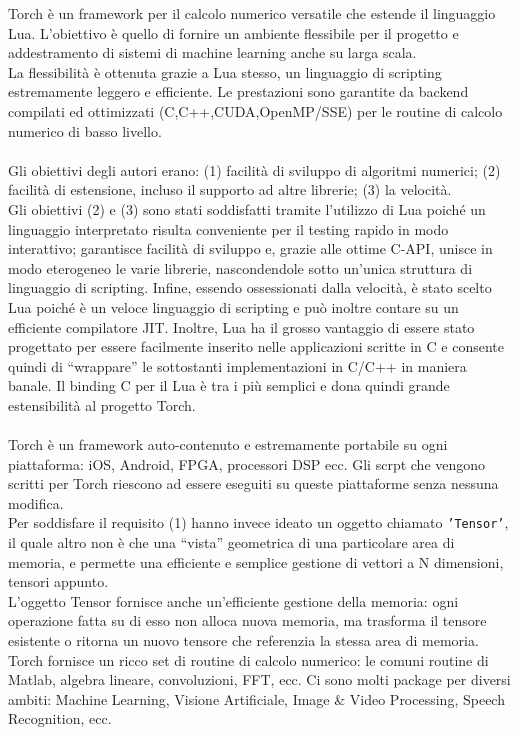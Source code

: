 Torch\parencite{WTorch} è un framework per il calcolo numerico versatile che estende il linguaggio Lua. L'obiettivo è quello di fornire un ambiente flessibile per il progetto e addestramento di sistemi di machine learning anche su larga scala.\\
La flessibilità è ottenuta grazie a Lua stesso, un linguaggio di scripting estremamente leggero e efficiente. Le prestazioni sono garantite da backend compilati ed ottimizzati (C,C++,CUDA,OpenMP/SSE) per le routine di calcolo numerico di basso livello.
\\
\\
Gli obiettivi degli autori erano: (1) facilità di sviluppo di algoritmi numerici; (2) facilità di
estensione, incluso il supporto ad altre librerie; (3) la velocità.\\
Gli obiettivi (2) e (3) sono stati soddisfatti tramite l'utilizzo di Lua poiché un linguaggio interpretato risulta conveniente per il testing rapido in modo interattivo; garantisce facilità di sviluppo e, grazie alle ottime C-API, unisce in modo eterogeneo le varie librerie,
nascondendole sotto un'unica struttura di linguaggio di scripting.  Infine, essendo ossessionati dalla velocità, è stato scelto Lua poiché è un veloce linguaggio di scripting e può inoltre contare su un efficiente compilatore JIT.
Inoltre, Lua ha il grosso vantaggio di essere stato progettato per essere facilmente inserito nelle applicazioni scritte in C e consente quindi di “wrappare” le sottostanti implementazioni in C/C++ in maniera banale. Il binding C per il Lua è tra i più semplici e dona quindi grande estensibilità al progetto Torch. 
\\
\\
Torch è un framework auto-contenuto e estremamente portabile su ogni piattaforma: iOS, Android, FPGA, processori DSP ecc. Gli scrpt che vengono scritti per Torch riescono ad essere eseguiti su queste piattaforme senza nessuna modifica.
\\
Per soddisfare il requisito (1) hanno invece ideato un oggetto chiamato \texttt{'Tensor'}, il quale altro non è che una “vista” geometrica di una particolare area di memoria, e permette una efficiente e semplice 
gestione di vettori a N dimensioni, tensori appunto.\\
L’oggetto Tensor fornisce anche un’efficiente gestione della memoria: ogni operazione fatta su di esso non alloca nuova memoria, ma trasforma il tensore esistente o ritorna un nuovo tensore che referenzia la stessa area di memoria.
Torch fornisce un ricco set di routine di calcolo numerico: le comuni routine di Matlab, algebra lineare, convoluzioni, FFT, ecc. Ci sono molti package per diversi ambiti: Machine Learning, Visione Artificiale, Image \& Video Processing, Speech Recognition, ecc.\\
